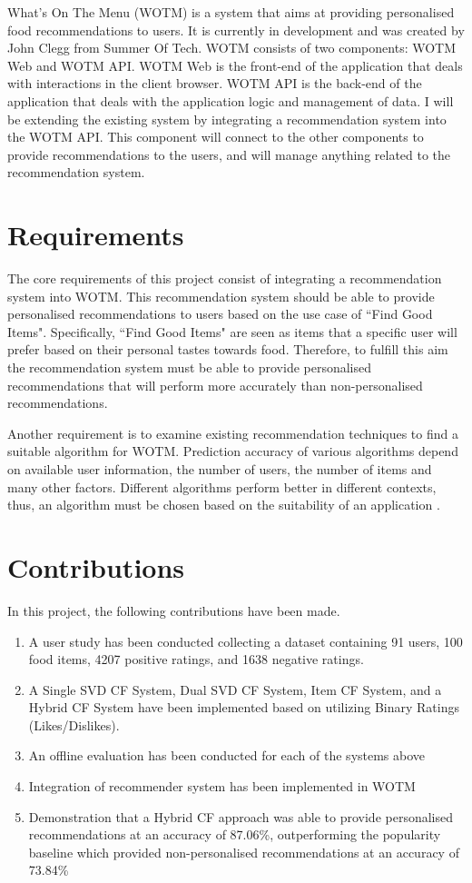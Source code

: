 What's On The Menu (WOTM) is a system that aims at providing personalised food recommendations to users. It is currently in development and was created by John Clegg from Summer Of Tech. WOTM consists of two components: WOTM Web and WOTM API. WOTM Web is the front-end of the application that deals with interactions in the client browser. WOTM API is the back-end of the application that deals with the application logic and management of data. I will be extending the existing system by integrating a recommendation system into the WOTM API. This component will connect to the other components to provide recommendations to the users, and will manage anything related to the recommendation system.

\section{Requirements}

The core requirements of this project consist of integrating a recommendation system into WOTM. This recommendation system should be able to provide personalised recommendations to users based on the use case of ``Find Good Items". Specifically, ``Find Good Items" are seen as items that a specific user will prefer based on their personal tastes towards food. Therefore, to fulfill this aim the recommendation system must be able to provide personalised recommendations that will perform more accurately than non-personalised recommendations. 

Another requirement is to examine existing recommendation techniques to find a suitable algorithm for WOTM. Prediction accuracy of various algorithms depend on available user information, the number of users, the number of items and many other factors. Different algorithms perform better in different contexts, thus, an algorithm must be chosen based on the suitability of an application \cite{memorybased}.

\section{Contributions}
In this project, the following contributions have been made. 
\begin{enumerate}
	\item{A user study has been conducted collecting a dataset containing 91 users, 100 food items, 4207 positive ratings, and 1638 negative ratings.}
	\item{A Single SVD CF System, Dual SVD CF System, Item CF System, and a Hybrid CF System have been implemented based on utilizing Binary Ratings (Likes/Dislikes).}
	\item{An offline evaluation has been conducted for each of the systems above}
	\item{Integration of recommender system has been implemented in WOTM}
	\item{Demonstration that a Hybrid CF approach was able to provide personalised recommendations at an accuracy of 87.06\%, outperforming the popularity baseline which provided non-personalised recommendations at an accuracy of 73.84\%}
\end{enumerate}
